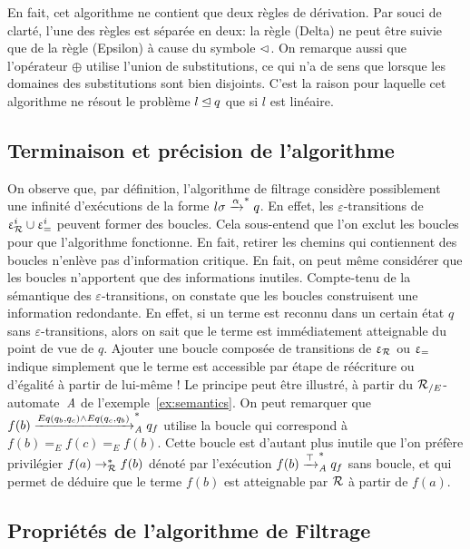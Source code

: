 En fait, cet algorithme ne contient que deux règles de dérivation. Par souci de clarté, l'une des règles est séparée en deux:
la règle (Delta) ne peut être suivie que de la règle (Epsilon) à cause du symbole $\lhd$. On remarque aussi que l'opérateur $\oplus$
utilise l'union de substitutions, ce qui n'a de sens que lorsque les domaines des substitutions sont bien disjoints. C'est la raison
pour laquelle cet algorithme ne résout le problème $l \unlhd q$ que si $l$ est linéaire.

\subsection{Terminaison et précision de l'algorithme}

On observe que, par définition, l'algorithme de filtrage considère possiblement
une infinité d'exécutions de la forme $l\sigma \xrightarrow{\alpha}^* q$.
En effet, les $\varepsilon$-transitions de $\upvarepsilon_{\mathcal R}^i \cup \upvarepsilon_{=}^i$ peuvent former des boucles. 
Cela sous-entend que l'on exclut les boucles pour que l'algorithme fonctionne.
En fait, retirer les chemins qui contiennent des boucles n'enlève pas d'information
critique. En fait, on peut même considérer que les boucles n'apportent que des
informations inutiles. Compte-tenu de la sémantique des $\varepsilon$-transitions, 
on constate que les boucles construisent une information redondante. En effet, si un
terme est reconnu dans un certain état $q$ sans $\varepsilon$-transitions, alors on sait
que le terme est immédiatement atteignable du point de vue de $q$. Ajouter une boucle composée
de transitions de $\upvarepsilon_{\mathcal R}$ ou $\upvarepsilon_{=}$ indique simplement que le terme est accessible par étape de 
réécriture ou d'égalité à partir de lui-même ! Le principe peut être illustré, à partir du ${\mathcal R_{/E}}$-automate~$\mathit A$
de l'exemple~\ref{ex:semantics}. On peut remarquer que $f(b) \xrightarrow{Eq(q_b, q_c)
  \land Eq(q_c, q_b)}_\mathit A^* q_f$ utilise la boucle qui correspond à $f(b) =_E f(c) =_E f(b)$. 
Cette boucle est d'autant plus inutile que l'on préfère privilégier $f(a) \rightarrow_\mathcal R^* f(b)$ 
dénoté par l'exécution $f(b) \xrightarrow{\top}_\mathit A^* q_f$ sans boucle, et qui permet de déduire que le terme $f(b)$
est atteignable par $\mathcal R$ à partir de $f(a)$.

\subsection{Propriétés de l'algorithme de Filtrage}

